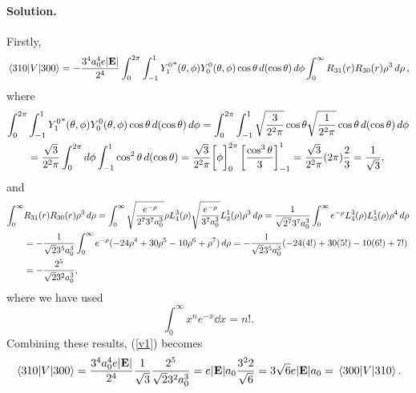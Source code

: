 \documentclass[11pt]{article}
\newcommand{\refeq}[1]{(\ref{#1})}
\newcommand{\beq}{\begin{equation*}}
\newcommand{\eeq}{\end{equation*}}
\newcommand{\beqn}{\begin{equation}}
\newcommand{\eeqn}{\end{equation}}
\newenvironment{solution}
{
    \paragraph{Solution.}
    \ignorespaces
}
{
}
\begin{document}
\begin{solution}
	Firstly,
	\beqn \label{v1}
		\mel{3 1 0}{V}{3 0 0} = -\frac{3^4 \ao^4 e |\vE|}{2^4} \int_0^{2\pi} \int_{-1}^1 {Y_1^0}^*(\tht, \phi) Y_0^0(\tht, \phi) \cos\tht \dcost \dphi \int_0^\infty R_{3 1}(r) R_{3 0}(r) \rho^3 \drho,
	\eeqn
	where
	\begin{align*}
		\int_0^{2\pi} &\int_{-1}^1 {Y_1^0}^*(\theta, \phi) Y_0^0(\theta, \phi) \cos\theta \dd{(\cos\theta)} \dd{\phi}
		= \int_0^{2\pi} \int_{-1}^1 \sqrt{\frac{3}{2^2 \pi}} \cos\theta \sqrt{\frac{1}{2^2 \pi}} \cos\theta \dd{(\cos\theta)} \dd{\phi} \\
		&= \frac{\sqrt{3}}{2^2 \pi} \int_0^{2\pi} \dd{\phi} \int_{-1}^1 \cos^2\theta \dd{(\cos\theta)}
		= \frac{\sqrt{3}}{2^2 \pi} \bigg[ \phi \bigg]_0^{2\pi} \left[ \frac{\cos^3\theta}{3} \right]_{-1}^1
		= \frac{\sqrt{3}}{2^2 \pi} (2 \pi) \frac{2}{3}
		= \frac{1}{\sqrt{3}},
	\end{align*}
	and
	\begin{align*}
		\int_0^\infty &R_{3 1}(r) R_{3 0}(r) \rho^3 \dd{\rho}
		= \int_0^\infty \sqrt{\frac{e^{-\rho}}{2^7 3^7 a_0^3}} \rho L_4^3(\rho) \sqrt{\frac{e^{-\rho}}{3^7 a_0^3}} L_3^1(\rho) \rho^3 \dd{\rho}
		= \frac{1}{\sqrt{2^7} 3^7 a_0^3} \int_0^\infty e^{-\rho} L_4^3(\rho) L_3^1(\rho) \rho^4 \dd{\rho} \\
		&= -\frac{1}{\sqrt{2} 3^5 a_0^3} \int_0^\infty e^{-\rho} (-24 \rho^4 + 30 \rho^5 - 10 \rho^6 + \rho^7) \dd{\rho}
		= -\frac{1}{\sqrt{2} 3^5 a_0^3} (-24 (4!) + 30 (5!) - 10 (6!) + 7!) \\
		&= -\frac{2^5}{\sqrt{2} 3^2 a_0^3},
	\end{align*}
	where we have used
	\beq
		\int_0^\infty x^n e^{-x} \dd{x} = n!.
	\eeq
	Combining these results, \refeq{v1} becomes
	\beq
		\mel{3 1 0}{V}{3 0 0} = \frac{3^4 \ao^4 e |\vE|}{2^4} \frac{1}{\sqrt{3}} \frac{2^5}{\sqrt{2} 3^2 \ao^3}
		= e |\vE| \ao \frac{3^2 2}{\sqrt{6}}
		= 3 \sqrt{6} e |\vE| \ao
		= \mel{3 0 0}{V}{3 1 0}.
	\eeq
	

\end{solution}
\end{document}
